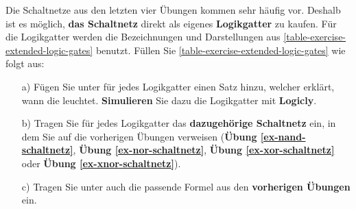 \begin{exercise}[subtitle={Zusatzaufgabe}]
\label{exercise-xor-nor-nand-xnor}
Die Schaltnetze aus den letzten vier Übungen kommen sehr häufig vor. Deshalb ist es möglich, \textbf{das Schaltnetz} direkt als eigenes \textbf{Logikgatter} zu kaufen. Für die Logikgatter werden die Bezeichnungen und Darstellungen aus \autoref{table-exercise-extended-logic-gates} benutzt. Füllen Sie \autoref{table-exercise-extended-logic-gates} wie folgt aus:

\begin{enumerate}
\item[a)] Fügen Sie unter  für jedes Logikgatter einen Satz hinzu, welcher erklärt, wann die  leuchtet. \textbf{Simulieren} Sie dazu die Logikgatter mit \textbf{Logicly}.
\item[b)] Tragen Sie für jedes Logikgatter das \textbf{dazugehörige Schaltnetz} ein, in dem Sie auf die vorherigen Übungen verweisen (\textbf{Übung \ref{ex-nand-schaltnetz}}, \textbf{Übung \ref{ex-nor-schaltnetz}}, \textbf{Übung \ref{ex-xor-schaltnetz}} oder \textbf{Übung \ref{ex-xnor-schaltnetz}}).
\item[c)] Tragen Sie unter  auch die passende Formel aus den \textbf{vorherigen Übungen} ein.
\end{enumerate}


\end{exercise}
